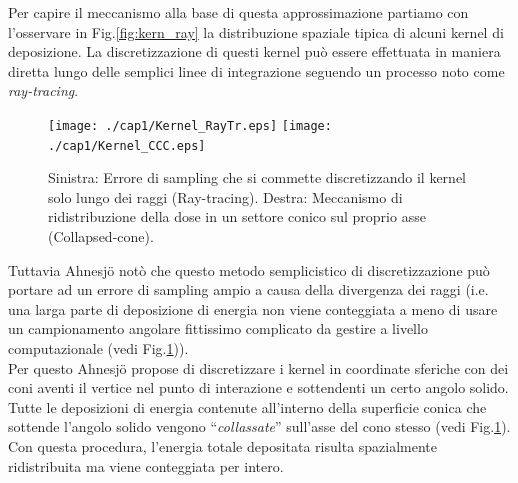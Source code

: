 {Per capire il meccanismo alla base di questa approssimazione partiamo con l'osservare in Fig.\ref{fig:kern_ray} la distribuzione spaziale tipica di alcuni kernel di deposizione. La discretizzazione di questi kernel può essere effettuata in maniera diretta lungo delle semplici linee di integrazione seguendo un processo noto come \textit{ray-tracing}.
\begin{figure}
\centering
\texttt{[image: ./cap1/Kernel\_RayTr.eps]}
\texttt{[image: ./cap1/Kernel\_CCC.eps]}
\caption{Sinistra: Errore di sampling che si commette discretizzando il kernel solo lungo dei raggi (Ray-tracing). Destra: Meccanismo di ridistribuzione della dose in un settore conico sul proprio asse (Collapsed-cone).}
\label{fig:raytrace_vs_cc}
\end{figure}
Tuttavia Ahnesj\"{o} notò che questo metodo semplicistico di discretizzazione può portare ad un errore di sampling ampio a causa della divergenza dei raggi \cite{Ahnesjo1989} (i.e. una larga parte di deposizione di energia non viene conteggiata a meno di usare un campionamento angolare fittissimo complicato da gestire a livello computazionale (vedi Fig.\ref{fig:raytrace_vs_cc})).\\
Per questo Ahnesj\"{o} propose di discretizzare i kernel in coordinate sferiche con dei coni aventi il vertice nel punto di interazione e sottendenti un certo angolo solido. Tutte le deposizioni di energia contenute all'interno della superficie conica che sottende l'angolo solido vengono \textquotedblleft\textit{collassate}\textquotedblright{} sull'asse del cono stesso (vedi Fig.\ref{fig:raytrace_vs_cc}). Con questa procedura, l'energia totale depositata risulta spazialmente ridistribuita ma viene conteggiata per intero.

}
